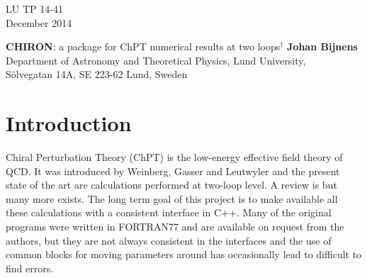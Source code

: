 \documentclass[12pt,a4paper]{article}
\begin{document}
\begin{titlepage}
\begin{flushright}
LU TP 14-41\\
December 2014\\
\end{flushright}
\vfill
\begin{center}
{\Large\textbf {CHIRON}: a package for ChPT numerical results
at two loops$^\dagger$}
\vfill
{\bf Johan Bijnens}\\[0.3cm]
{Department of Astronomy and Theoretical Physics, Lund University,\\
S\"olvegatan 14A, SE 223-62 Lund, Sweden}
\end{center}
\vfill
\begin{abstract}
This document describes the package {\textsc CHIRON}
which includes two libraries, \texttt{chiron} itself and \texttt{jbnumlib}.

\texttt{chiron} is a set of routines useful for two-loop numerical results in
Chiral Perturbation Theory (ChPT). 
It includes programs for the needed
one- and two-loop integrals as well as
routines to deal with the ChPT parameters.
The present version includes everything needed for the masses, decay
constants and quark-antiquark vacuum-expectation-values.
An added routine calculates consistent values for the masses and decay constants
when the pion and kaon masses are varied.
In addition a number of finite volume results are included:
one-loop tadpole integrals, two-loop sunset integrals
and the results for masses and decay constants.

The numerical routine library \texttt{jbnumlib}
contains the numerical routines used in \texttt{chiron}. Many are to a large
extent simple {\textsc C++} versions of routines in the CERNLIB numerical
library. Notable exceptions are the dilogarithm and
the Jacobi theta function implementations.

This paper describes what is included in \textsc{CHIRON} v0.50.
\end{abstract}
\vfill
\end{titlepage}

\tableofcontents

\section{Introduction}

Chiral Perturbation Theory (ChPT)
is the low-energy effective field theory of QCD.
It was introduced by Weinberg, Gasser and Leutwyler
\cite{Weinberg:1978kz,Gasser:1983yg,Gasser:1984gg} and the present state of
the art are calculations performed at two-loop level.
A review is \cite{Bijnens:2006zp} but many more exists. The long term goal
of this project is to make available all these calculations with a consistent
interface in {\textsc C++}. Many of the original programs were written in
{\textsc FORTRAN77} and are available on request from the authors, but they are
not always consistent in the interfaces and the use of common blocks
for moving parameters around has occasionally lead to difficult to find errors.
\end{document}
